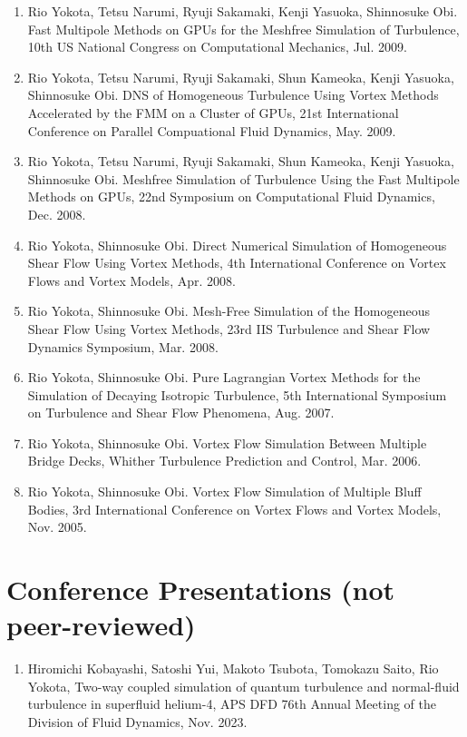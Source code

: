 \documentclass[margin,line]{cv}
\begin{document}
\begin{resume}
\begin{enumerate}
\item Rio Yokota, Tetsu Narumi, Ryuji Sakamaki, Kenji Yasuoka, Shinnosuke Obi. Fast Multipole Methods on GPUs for the Meshfree Simulation of Turbulence, 10th US National Congress on Computational Mechanics, Jul. 2009.

\item Rio Yokota, Tetsu Narumi, Ryuji Sakamaki, Shun Kameoka, Kenji Yasuoka, Shinnosuke Obi. DNS of Homogeneous Turbulence Using Vortex Methods Accelerated by the FMM on a Cluster of GPUs, 21st International Conference on Parallel Compuational Fluid Dynamics, May. 2009.

\item Rio Yokota, Tetsu Narumi, Ryuji Sakamaki, Shun Kameoka, Kenji Yasuoka, Shinnosuke Obi. Meshfree Simulation of Turbulence Using the Fast Multipole Methods on GPUs, 22nd Symposium on Computational Fluid Dynamics, Dec. 2008.

\item Rio Yokota, Shinnosuke Obi. Direct Numerical Simulation of Homogeneous Shear Flow Using Vortex Methods, 4th International Conference on Vortex Flows and Vortex Models, Apr. 2008.

\item Rio Yokota, Shinnosuke Obi. Mesh-Free Simulation of the Homogeneous Shear Flow Using Vortex Methods, 23rd IIS Turbulence and Shear Flow Dynamics Symposium, Mar. 2008.

\item Rio Yokota, Shinnosuke Obi. Pure Lagrangian Vortex Methods for the Simulation of Decaying Isotropic Turbulence, 5th International Symposium on Turbulence and Shear Flow Phenomena, Aug. 2007.

\item Rio Yokota, Shinnosuke Obi. Vortex Flow Simulation Between Multiple Bridge Decks, Whither Turbulence Prediction and Control, Mar. 2006.

\item Rio Yokota, Shinnosuke Obi. Vortex Flow Simulation of Multiple Bluff Bodies, 3rd International Conference on Vortex Flows and Vortex Models, Nov. 2005.
\end{enumerate}

\section{\sc Conference Presentations (not peer-reviewed)}
\begin{enumerate}
\item Hiromichi Kobayashi, Satoshi Yui, Makoto Tsubota, Tomokazu Saito, Rio Yokota, Two-way coupled simulation of quantum turbulence and normal-fluid turbulence in superfluid helium-4, APS DFD 76th Annual Meeting of the Division of Fluid Dynamics, Nov. 2023.


\end{enumerate}
\end{resume}
\end{document}
